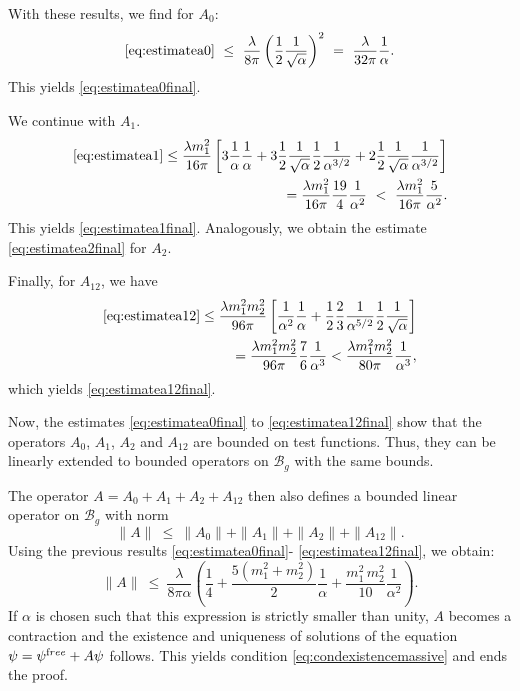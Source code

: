 \documentclass[b5paper,draft,openbib,12pt]{memoir}
\newcommand{\free}{{\textup free}}
\newcommand{\Banach}{\mathscr{B}}
\begin{document}
With these results, we find for $A_0$:
\begin{equation}
	\eqref{eq:estimatea0} ~\leq~ \frac{\lambda}{8\pi} \left(\frac{1}{2} \frac{1}{\sqrt{\alpha}}\right)^2 ~=~  \frac{\lambda}{32\pi} \frac{1}{\alpha}.
\end{equation}
This yields \eqref{eq:estimatea0final}.

We continue with $A_1$.
\begin{align}\notag
  \eqref{eq:estimatea1} \leq \frac{\lambda  m_1^2}{16\pi} \left[  3  \frac{1}{\alpha}  \frac{1}{\alpha} + 3  \frac{1}{2} \frac{1}{\sqrt{\alpha}}  \frac{1}{2} \frac{1}{\alpha^{3/2}} +2  \frac{1}{2} \frac{1}{\sqrt{\alpha}}  \frac{1}{\alpha^{3/2}} \right] \\
  = \frac{\lambda  m_1^2}{16\pi} \frac{19}{4} \frac{1}{\alpha^2} ~<~\frac{\lambda  m_1^2}{16\pi} \frac{5}{\alpha^2}.
\end{align}
This yields \eqref{eq:estimatea1final}. Analogously, we obtain the 
estimate \eqref{eq:estimatea2final} for $A_2$.

Finally, for $A_{12}$, we have
\begin{align}
  \eqref{eq:estimatea12} \leq \frac{\lambda  m_1^2 m_2^2}{96 \pi} \left[ \frac{1}{\alpha^2}  \frac{1}{\alpha} + \frac{1}{2}  \frac{2}{3} \frac{1}{\alpha^{5/2}}  \frac{1}{2} \frac{1}{\sqrt{\alpha}} \right] \notag\\
  = \frac{\lambda  m_1^2 m_2^2}{96\pi}  \frac{7}{6} \frac{1}{\alpha^3} < \frac{\lambda  m_1^2 m_2^2}{80 \pi}  \frac{1}{\alpha^3},
\end{align}
which yields \eqref{eq:estimatea12final}.

Now, the estimates \eqref{eq:estimatea0final} to
\eqref{eq:estimatea12final} show that the operators 
$A_0$, $A_1$, $A_2$ and $A_{12}$ are bounded on test functions. 
Thus, they can be linearly extended to bounded operators on 
$\Banach_g$ with the same bounds.

The operator $A = A_0 + A_1 + A_2 + A_{12}$ then also defines a 
bounded linear operator on $\Banach_g$ with norm
\begin{equation}
	\| A \| ~\leq~ \| A_0 \| + \| A_1 \| + \| A_2 \| + \| A_{12} \|.
\end{equation}
Using the previous results \eqref{eq:estimatea0final}-
\eqref{eq:estimatea12final}, we obtain:
\begin{equation}
	\|A \| ~\leq~ \frac{\lambda}{8\pi \alpha} \left( \frac{1}{4} + \frac{5(m_1^2 + m_2^2)}{2} \frac{1}{\alpha} + \frac{m_1^2 \, m_2^2}{10} \frac{1}{\alpha^2} \right).
\end{equation}
If $\alpha$ is chosen such that this expression is strictly smaller 
than unity, $A$ becomes a contraction and the existence and 
uniqueness of solutions of the equation $\psi = \psi^\free + A\psi$ 
follows. This yields condition \eqref{eq:condexistencemassive} and 
ends the proof.
\end{document}
